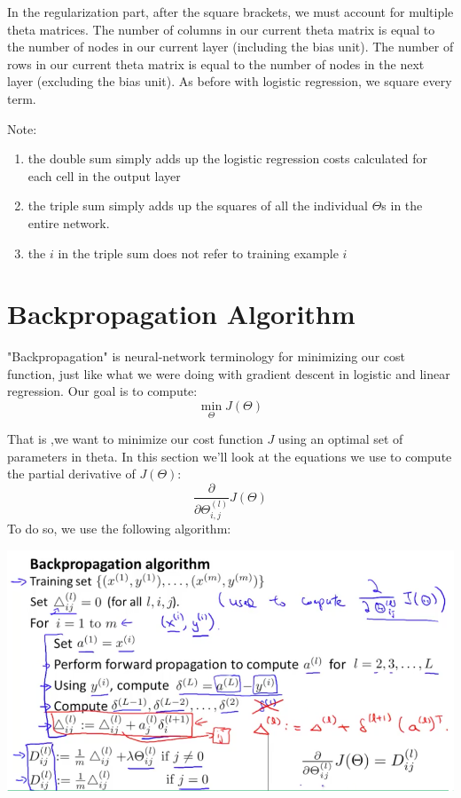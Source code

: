 \documentclass[10pt,a4paper,UTF8]{article}
\begin{document}
In the regularization part, after the square brackets, we must account for multiple theta matrices. The number of columns in our current theta matrix is equal to the number of nodes in our current layer (including the bias unit). The number of rows in our current theta matrix is equal to the number of nodes in the next layer (excluding the bias unit). As before with logistic regression, we square every term.

Note:

\begin{enumerate}
\item the double sum simply adds up the logistic regression costs calculated for each cell in the output layer
\item the triple sum simply adds up the squares of all the individual \(\Theta\)s in the entire network.
\item the \(i\) in the triple sum does not refer to training example \(i\)
\end{enumerate}
\section{Backpropagation Algorithm}
\label{sec:orgb6f2bfd}


"Backpropagation" is neural-network terminology for minimizing our cost function, just like what we were doing with gradient descent in logistic and linear regression. Our goal is to compute:
\begin{equation}
\label{eq:3}
\underset{\Theta}{\min} J(\Theta)
\end{equation}

That is ,we want to minimize our cost function \(J\) using an optimal set of parameters in theta. In this section we'll look at the equations we use to compute the partial derivative of \(J(\Theta)\):
\begin{equation}
\label{eq:4}
\frac{\partial}{\partial \Theta_{i,j}^{(l)}}J(\Theta)
\end{equation}
To do so, we use the following algorithm:


\begin{center}
\includegraphics[width=.9\linewidth]{../../img/computer_ng/20171014BP.png}
\end{center}
\end{document}
